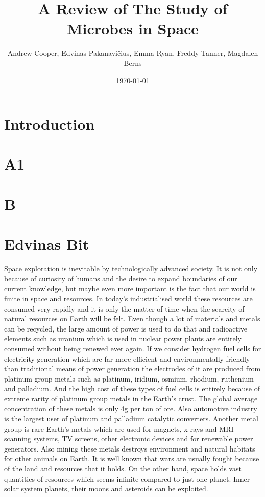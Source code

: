 \documentclass[12pt]{article}
\title{A Review of The Study of Microbes in Space}
\author{Andrew Cooper, Edvinas Pakanavičius, Emma Ryan, Freddy Tanner, Magdalen Berns}
\date{\today}
\begin{document}
\maketitle
\thispagestyle{empty}

\begin{abstract}
\noindent

\end{abstract}

\clearpage
\tableofcontents
\thispagestyle{empty}
\clearpage

\section{Introduction}
\section{A1}
\section{B}
\section{Edvinas Bit}

Space exploration is inevitable by technologically advanced society. It is not only because of curiosity of humans and the desire to expand boundaries of our current knowledge, but maybe even more important is the fact that our world is finite in space and resources. In today’s industrialised world these resources are consumed very rapidly and it is only the matter of time when the scarcity of natural resources on Earth will be felt. Even though a lot of materials and
metals can be recycled, the large amount of power is used to do that and radioactive elements such as uranium which is used in nuclear power plants are entirely consumed without being renewed ever again. If we consider hydrogen fuel cells for electricity generation which are far more efficient and environmentally friendly than traditional means of power generation the electrodes of it are produced from platinum group metals such as platinum, iridium, osmium, rhodium, ruthenium and palladium. And the high cost of these types of fuel cells is entirely because of extreme rarity of platinum group metals in the Earth’s crust. The global average concentration of these metals is only 4g per ton of ore. Also automotive industry is the largest
user of platinum and palladium catalytic converters. Another metal group is rare Earth's metals which are used for magnets, x-rays and MRI scanning systems, TV screens, other electronic devices and for renewable power generators. Also mining these metals destroys environment and natural habitats for other animals on Earth. It is well known that wars are usually fought because of the land and resources that it holds. On the other hand, space holds vast quantities of
resources which seems infinite compared to just one planet. Inner solar system planets, their moons and asteroids can be exploited.
\end{document}
